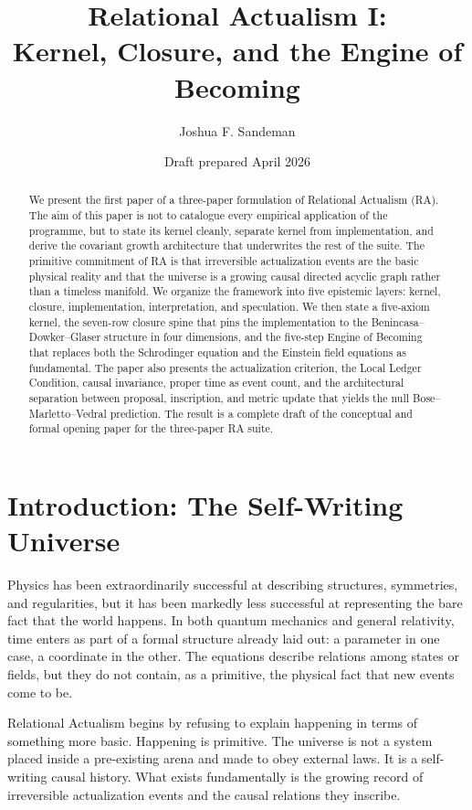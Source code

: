 \documentclass[11pt]{article}
\title{Relational Actualism I:\\Kernel, Closure, and the Engine of Becoming}
\author{Joshua F. Sandeman}
\date{Draft prepared April 2026}
\begin{document}
\maketitle

\begin{abstract}
We present the first paper of a three-paper formulation of Relational Actualism (RA). The aim of this paper is not to catalogue every empirical application of the programme, but to state its kernel cleanly, separate kernel from implementation, and derive the covariant growth architecture that underwrites the rest of the suite. The primitive commitment of RA is that irreversible actualization events are the basic physical reality and that the universe is a growing causal directed acyclic graph rather than a timeless manifold. We organize the framework into five epistemic layers: kernel, closure, implementation, interpretation, and speculation. We then state a five-axiom kernel, the seven-row closure spine that pins the implementation to the Benincasa--Dowker--Glaser structure in four dimensions, and the five-step Engine of Becoming that replaces both the Schrodinger equation and the Einstein field equations as fundamental. The paper also presents the actualization criterion, the Local Ledger Condition, causal invariance, proper time as event count, and the architectural separation between proposal, inscription, and metric update that yields the null Bose--Marletto--Vedral prediction. The result is a complete draft of the conceptual and formal opening paper for the three-paper RA suite.
\end{abstract}

\section{Introduction: The Self-Writing Universe}
Physics has been extraordinarily successful at describing structures, symmetries, and regularities, but it has been markedly less successful at representing the bare fact that the world happens. In both quantum mechanics and general relativity, time enters as part of a formal structure already laid out: a parameter in one case, a coordinate in the other. The equations describe relations among states or fields, but they do not contain, as a primitive, the physical fact that new events come to be.

Relational Actualism begins by refusing to explain happening in terms of something more basic. Happening is primitive. The universe is not a system placed inside a pre-existing arena and made to obey external laws. It is a self-writing causal history. What exists fundamentally is the growing record of irreversible actualization events and the causal relations they inscribe.
\end{document}

